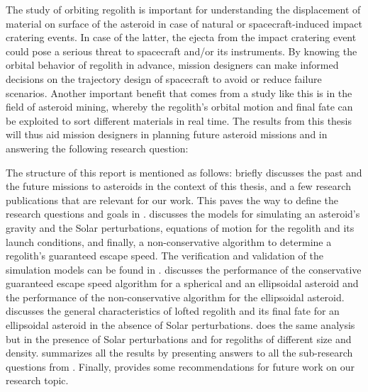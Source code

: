 %
\newline\newline
%
The study of orbiting regolith is important for understanding the displacement of material on surface of the asteroid in case of natural or spacecraft-induced impact cratering events. In case of the latter, the ejecta from the impact cratering event could pose a serious threat to spacecraft and/or its instruments. By knowing the orbital behavior of regolith in advance, mission designers can make informed decisions on the trajectory design of spacecraft to avoid or reduce failure scenarios. Another important benefit that comes from a study like this is in the field of asteroid mining, whereby the regolith's orbital motion and final fate can be exploited to sort different materials in real time. The results from this thesis will thus aid mission designers in planning future asteroid missions and in answering the following research question:
\vspace{5mm}
\begin{center}
\end{center}
\vspace{5mm}
The structure of this report is mentioned as follows:  briefly discusses the past and the future missions to asteroids in the context of this thesis, and a few research publications that are relevant for our work. This paves the way to define the research questions and goals in .  discusses the models for simulating an asteroid's gravity and the Solar perturbations, equations of motion for the regolith and its launch conditions, and finally, a non-conservative algorithm to determine a regolith's guaranteed escape speed. The verification and validation of the simulation models can be found in .  discusses the performance of the conservative guaranteed escape speed algorithm for a spherical and an ellipsoidal asteroid and the performance of the non-conservative algorithm for the ellipsoidal asteroid.  discusses the general characteristics of lofted regolith and its final fate for an ellipsoidal asteroid in the absence of Solar perturbations.  does the same analysis but in the presence of Solar perturbations and for regoliths of different size and density.  summarizes all the results by presenting answers to all the sub-research questions from . Finally,  provides some recommendations for future work on our research topic.

